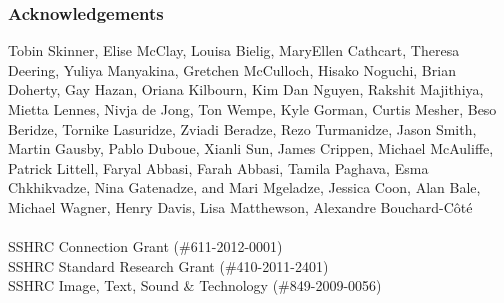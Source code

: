 \documentclass{beamer}
\begin{document}
\begin{frame}
\frametitle{Acknowledgements}

\small
Tobin Skinner, Elise McClay, Louisa Bielig, MaryEllen Cathcart, Theresa
Deering, Yuliya Manyakina, Gretchen McCulloch, Hisako Noguchi, Brian Doherty,
Gay Hazan, Oriana Kilbourn, Kim Dan Nguyen, Rakshit Majithiya, Mietta Lennes,
Nivja de Jong, Ton Wempe, Kyle Gorman, Curtis Mesher, Beso Beridze, Tornike
Lasuridze, Zviadi Beradze, Rezo Turmanidze, Jason Smith, Martin Gausby, Pablo
Duboue, Xianli Sun, James Crippen, Michael McAuliffe, Patrick Littell, Faryal
Abbasi, Farah Abbasi, Tamila Paghava, Esma Chkhikvadze, Nina Gatenadze, and
Mari Mgeladze, Jessica Coon, Alan Bale, Michael Wagner, Henry Davis, Lisa
Matthewson, Alexandre Bouchard-Côté
~\\
~\\
SSHRC Connection Grant (\#611-2012-0001) \\
SSHRC Standard Research Grant (\#410-2011-2401) \\
SSHRC Image, Text, Sound \& Technology (\#849-2009-0056)
\normalsize
{}

\end{frame}
\end{document}
